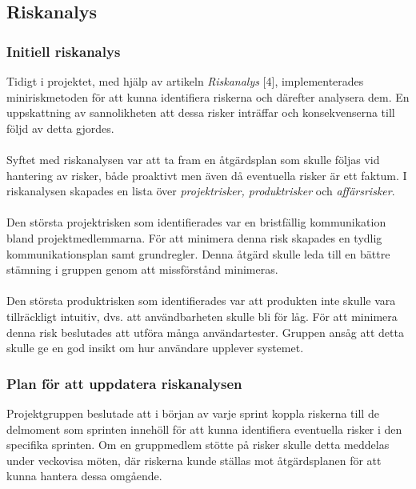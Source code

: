 \documentclass[12pt]{article}
\begin{document}
\subsection{Riskanalys}
\subsubsection{Initiell riskanalys}

 Tidigt i projektet, med hjälp av artikeln \textit{Riskanalys} [4], implementerades miniriskmetoden för att kunna identifiera riskerna och därefter analysera dem. En uppskattning av sannolikheten att dessa risker inträffar och konsekvenserna till följd av detta gjordes.\\\\
 Syftet med riskanalysen var att ta fram en åtgärdsplan som skulle följas vid hantering av risker, både proaktivt men även då eventuella risker är ett faktum. I riskanalysen skapades en lista över \textit{projektrisker, produktrisker} och \textit{affärsrisker}.\\\\
 Den största projektrisken som identifierades var en bristfällig kommunikation bland projektmedlemmarna. För att minimera denna risk skapades en tydlig kommunikationsplan samt grundregler. Denna åtgärd skulle leda till en bättre stämning i gruppen genom att missförstånd minimeras.\\\\
 Den största produktrisken som identifierades var att produkten inte skulle vara tillräckligt intuitiv, dvs. att användbarheten skulle bli för låg. För att minimera denna risk beslutades att utföra många användartester. Gruppen ansåg att detta skulle ge en god insikt om hur användare upplever systemet. \subsubsection{Plan för att uppdatera riskanalysen}
 Projektgruppen beslutade att i början av varje sprint koppla riskerna till de delmoment som sprinten innehöll för att kunna identifiera eventuella risker i den specifika sprinten. Om en gruppmedlem stötte på risker skulle detta meddelas under veckovisa möten, där riskerna kunde ställas mot åtgärdsplanen för att kunna hantera dessa omgående.
\end{document}
